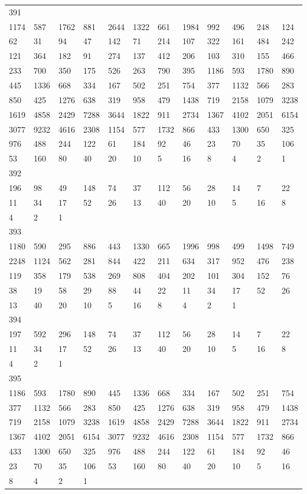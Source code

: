 \begin{longtable}{llllllllllll}
391&&&&&&&&&&&\\
1174& 587& 1762& 881& 2644& 1322& 661& 1984& 992& 496& 248& 124\\
62& 31& 94& 47& 142& 71& 214& 107& 322& 161& 484& 242\\
121& 364& 182& 91& 274& 137& 412& 206& 103& 310& 155& 466\\
233& 700& 350& 175& 526& 263& 790& 395& 1186& 593& 1780& 890\\
445& 1336& 668& 334& 167& 502& 251& 754& 377& 1132& 566& 283\\
850& 425& 1276& 638& 319& 958& 479& 1438& 719& 2158& 1079& 3238\\
1619& 4858& 2429& 7288& 3644& 1822& 911& 2734& 1367& 4102& 2051& 6154\\
3077& 9232& 4616& 2308& 1154& 577& 1732& 866& 433& 1300& 650& 325\\
976& 488& 244& 122& 61& 184& 92& 46& 23& 70& 35& 106\\
53& 160& 80& 40& 20& 10& 5& 16& 8& 4& 2& 1\\

392&&&&&&&&&&&\\
196& 98& 49& 148& 74& 37& 112& 56& 28& 14& 7& 22\\
11& 34& 17& 52& 26& 13& 40& 20& 10& 5& 16& 8\\
4& 2& 1& \\

393&&&&&&&&&&&\\
1180& 590& 295& 886& 443& 1330& 665& 1996& 998& 499& 1498& 749\\
2248& 1124& 562& 281& 844& 422& 211& 634& 317& 952& 476& 238\\
119& 358& 179& 538& 269& 808& 404& 202& 101& 304& 152& 76\\
38& 19& 58& 29& 88& 44& 22& 11& 34& 17& 52& 26\\
13& 40& 20& 10& 5& 16& 8& 4& 2& 1& \\

394&&&&&&&&&&&\\
197& 592& 296& 148& 74& 37& 112& 56& 28& 14& 7& 22\\
11& 34& 17& 52& 26& 13& 40& 20& 10& 5& 16& 8\\
4& 2& 1& \\

395&&&&&&&&&&&\\
1186& 593& 1780& 890& 445& 1336& 668& 334& 167& 502& 251& 754\\
377& 1132& 566& 283& 850& 425& 1276& 638& 319& 958& 479& 1438\\
719& 2158& 1079& 3238& 1619& 4858& 2429& 7288& 3644& 1822& 911& 2734\\
1367& 4102& 2051& 6154& 3077& 9232& 4616& 2308& 1154& 577& 1732& 866\\
433& 1300& 650& 325& 976& 488& 244& 122& 61& 184& 92& 46\\
23& 70& 35& 106& 53& 160& 80& 40& 20& 10& 5& 16\\
8& 4& 2& 1& \\


\end{longtable}
